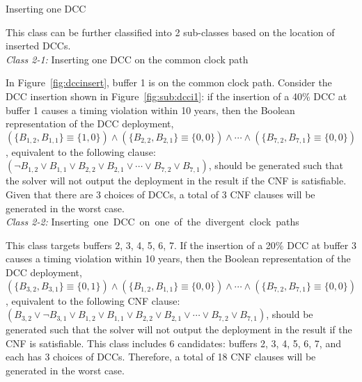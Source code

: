 \begin{class}
\label{class:c5}
Inserting one DCC

This class can be further classified into 2 sub-classes based on the location of inserted DCCs. \\
\textit{Class 2-1:} Inserting one DCC on the common clock path

In Figure~\ref{fig:dccinsert}, buffer 1 is on the common clock path. Consider the DCC insertion shown in Figure~\ref{fig:sub:dcci1}: if the insertion of a 40\% DCC at buffer 1 causes a timing violation within 10 years, then the Boolean representation of the DCC deployment, $\left(\{B_{1,2}, B_{1,1}\} \equiv \{1, 0\} \right) \land \left( \{B_{2,2}, B_{2,1}\} \equiv \{0, 0\} \right) \land \dotsb \land \left( \{B_{7,2}, B_{7,1}\} \equiv \{0, 0\} \right)$, equivalent to the following clause: $\left(\neg B_{1,2} \lor B_{1,1} \lor B_{2,2} \lor B_{2,1} \lor \dotsb \lor B_{7,2} \lor B_{7,1} \right)$, should be generated such that the solver will not output the deployment in the result if the CNF is satisfiable. Given that there are 3 choices of DCCs, a total of 3 CNF clauses will be generated in the worst case. \\
\textit{Class 2-2:} \mbox{\fontsize{9}{10.8}\selectfont Inserting one DCC on one of the divergent clock paths}

This class targets buffers 2, 3, 4, 5, 6, 7. If the insertion of a 20\% DCC at buffer 3 causes a timing violation within 10 years, then the Boolean representation of the DCC deployment, $\left(\{B_{3,2}, B_{3,1}\} \equiv \{0, 1\} \right) \land \left( \{B_{1,2}, B_{1,1}\} \equiv \{0, 0\} \right) \land \dotsb \land \left( \{B_{7,2}, B_{7,1}\} \equiv \{0, 0\} \right)$, equivalent to the following CNF clause: $\left(B_{3,2} \lor \neg B_{3,1} \lor B_{1,2} \lor B_{1,1} \lor B_{2,2} \lor B_{2,1} \lor \dotsb \lor B_{7,2} \lor B_{7,1} \right)$, should be generated such that the solver will not output the deployment in the result if the CNF is satisfiable. This class includes 6 candidates: buffers 2, 3, 4, 5, 6, 7, and each has 3 choices of DCCs. Therefore, a total of 18 CNF clauses will be generated in the worst case.
\end{class}

